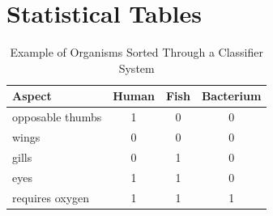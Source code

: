 \documentclass{strrespaper-trad}
\begin{document}
		

	\chapter{Statistical Tables}
		\begin{table}[htbp]
			\centering
			\caption{Example of Organisms Sorted Through a Classifier System}
			\label{tab:ex_classifier}
			\begin{tabular}{lccc}
				\toprule
				Aspect           & Human & Fish & Bacterium \\
				\midrule
				opposable thumbs & 1     & 0    & 0         \\
				wings            & 0     & 0    & 0         \\
				gills            & 0     & 1    & 0         \\
				eyes             & 1     & 1    & 0         \\
				requires oxygen  & 1     & 1    & 1         \\
				\bottomrule
			\end{tabular}
		\end{table}
\end{document}
